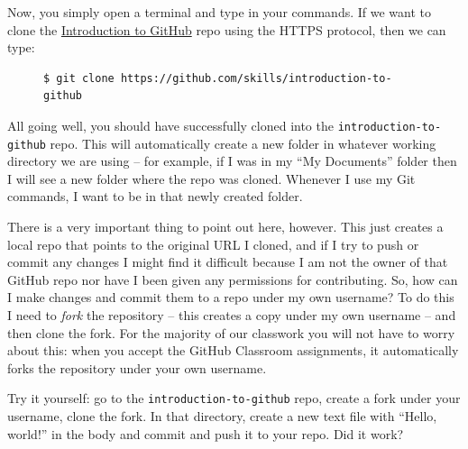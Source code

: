 \documentclass{tufte-book}
\begin{document}
Now, you simply open a terminal and type in your commands. If we want to clone the \href{https://github.com/skills/introduction-to-github}{Introduction to GitHub} repo using the HTTPS protocol, then we can type:

\begin{figure}
\begin{lstlisting}[backgroundcolor=\color{lightgray}]
$ git clone https://github.com/skills/introduction-to-github
\end{lstlisting}
\end{figure}

All going well, you should have successfully cloned into the \verb|introduction-to-github| repo. This will automatically create a new folder in whatever working directory we are using -- for example, if I was in my ``My Documents'' folder then I will see a new folder where the repo was cloned. Whenever I use my Git commands, I want to be in that newly created folder. 

There is a very important thing to point out here, however. This just creates a local repo that points to the original URL I cloned, and if I try to push or commit any changes I might find it difficult because I am not the owner of that GitHub repo nor have I been given any permissions for contributing. So, how can I make changes and commit them to a repo under my own username? To do this I need to \textit{fork} the repository -- this creates a copy under my own username -- and then clone the fork. For the majority of our classwork you will not have to worry about this: when you accept the GitHub Classroom assignments, it automatically forks the repository under your own username. 

Try it yourself: go to the \verb|introduction-to-github| repo, create a fork under your username, clone the fork. In that directory, create a new text file with ``Hello, world!'' in the body and commit and push it to your repo. Did it work?


\end{document}
